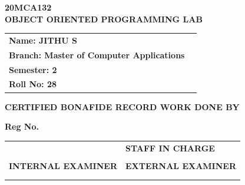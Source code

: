 \begin{titlepage}
\textbf{\large 20MCA132 \\ \vspace{0.3cm}OBJECT ORIENTED
PROGRAMMING LAB}
\vspace{0.45cm}

\begin{center}
\begin{tabular}{ll}
\vspace{0.45cm}

\textbf{\large Name: JITHU S} & \dotfill \\
\vspace{0.45cm}

\textbf{\large Branch: Master of Computer Applications} & \dotfill \\
\vspace{0.45cm}

\textbf{\large Semester: 2} & \dotfill \\
\vspace{0.45cm}

\textbf{\large Roll No: 28} & \dotfill \\
\end{tabular}
\end{center}


\textbf{\large CERTIFIED BONAFIDE RECORD WORK DONE BY}

\vspace{0.5cm}

\textbf{\large Reg No.} \dotfill

\vspace{1cm}
\begin{tabular}{ll}
\textbf{\large } & \hspace{0.7cm} \textbf{\large STAFF IN CHARGE} \\
\vspace{0.85cm}

& \\
\textbf{\large INTERNAL EXAMINER} &  \hspace{1.7cm}\textbf{\large EXTERNAL EXAMINER} \\
& \\
& \\
\end{tabular}
\end{titlepage}
